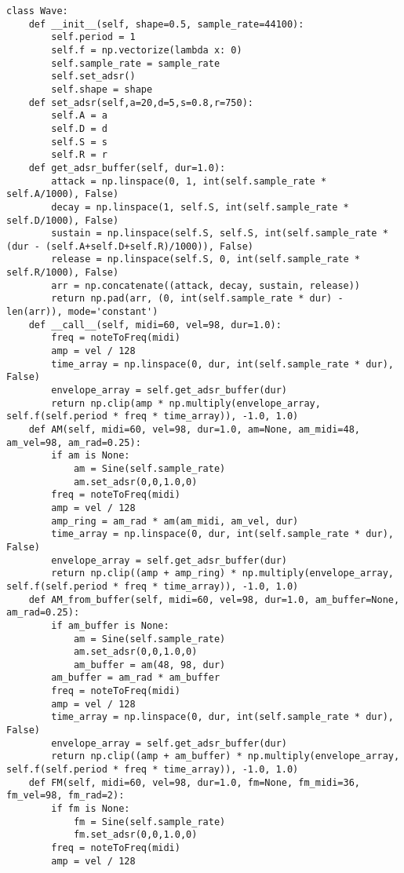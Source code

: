 \documentclass[../main.tex]{subfiles}
\begin{document}
\begin{verbatim}
class Wave:
    def __init__(self, shape=0.5, sample_rate=44100):
        self.period = 1
        self.f = np.vectorize(lambda x: 0)
        self.sample_rate = sample_rate
        self.set_adsr()
        self.shape = shape
    def set_adsr(self,a=20,d=5,s=0.8,r=750):
        self.A = a
        self.D = d
        self.S = s
        self.R = r
    def get_adsr_buffer(self, dur=1.0):
        attack = np.linspace(0, 1, int(self.sample_rate * self.A/1000), False)
        decay = np.linspace(1, self.S, int(self.sample_rate * self.D/1000), False)
        sustain = np.linspace(self.S, self.S, int(self.sample_rate * (dur - (self.A+self.D+self.R)/1000)), False)
        release = np.linspace(self.S, 0, int(self.sample_rate * self.R/1000), False)
        arr = np.concatenate((attack, decay, sustain, release))
        return np.pad(arr, (0, int(self.sample_rate * dur) - len(arr)), mode='constant')
    def __call__(self, midi=60, vel=98, dur=1.0):
        freq = noteToFreq(midi)
        amp = vel / 128
        time_array = np.linspace(0, dur, int(self.sample_rate * dur), False)
        envelope_array = self.get_adsr_buffer(dur)
        return np.clip(amp * np.multiply(envelope_array, self.f(self.period * freq * time_array)), -1.0, 1.0)
    def AM(self, midi=60, vel=98, dur=1.0, am=None, am_midi=48, am_vel=98, am_rad=0.25):
        if am is None:
            am = Sine(self.sample_rate)
            am.set_adsr(0,0,1.0,0)
        freq = noteToFreq(midi)
        amp = vel / 128
        amp_ring = am_rad * am(am_midi, am_vel, dur)
        time_array = np.linspace(0, dur, int(self.sample_rate * dur), False)
        envelope_array = self.get_adsr_buffer(dur)
        return np.clip((amp + amp_ring) * np.multiply(envelope_array, self.f(self.period * freq * time_array)), -1.0, 1.0)
    def AM_from_buffer(self, midi=60, vel=98, dur=1.0, am_buffer=None, am_rad=0.25):
        if am_buffer is None:
            am = Sine(self.sample_rate)
            am.set_adsr(0,0,1.0,0)
            am_buffer = am(48, 98, dur)
        am_buffer = am_rad * am_buffer
        freq = noteToFreq(midi)
        amp = vel / 128
        time_array = np.linspace(0, dur, int(self.sample_rate * dur), False)
        envelope_array = self.get_adsr_buffer(dur)
        return np.clip((amp + am_buffer) * np.multiply(envelope_array, self.f(self.period * freq * time_array)), -1.0, 1.0)
    def FM(self, midi=60, vel=98, dur=1.0, fm=None, fm_midi=36, fm_vel=98, fm_rad=2):
        if fm is None:
            fm = Sine(self.sample_rate)
            fm.set_adsr(0,0,1.0,0)
        freq = noteToFreq(midi)
        amp = vel / 128

\end{verbatim}
\end{document}
